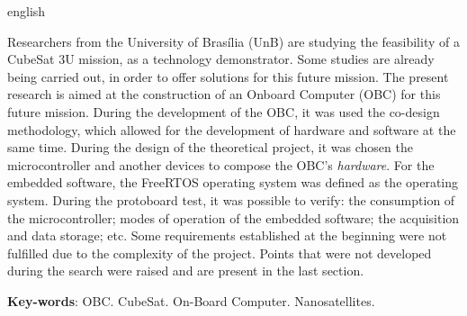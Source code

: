 \begin{resumo}[Abstract]
 \begin{otherlanguage*}{english}
 	
Researchers from the University of Brasília (UnB) are studying the feasibility of a CubeSat 3U mission, as a technology demonstrator. Some studies are already being carried out, in order to offer solutions for this future mission. The present research is aimed at the construction of an Onboard Computer (OBC) for this future mission. During the development of the OBC, it was used the co-design methodology, which allowed for the development of hardware and software at the same time. During the design of the theoretical project, it was chosen the microcontroller and another devices to compose the OBC's \textit {hardware}. For the embedded software, the FreeRTOS operating system was defined as the operating system. During the protoboard test, it was possible to verify: the consumption of the microcontroller; modes of operation of the embedded software; the acquisition and data storage; etc. Some requirements established at the beginning were not fulfilled due to the complexity of the project. Points that were not developed during the search were raised and are present in the last section.
   \vspace{\onelineskip}
 
   \noindent 
   \textbf{Key-words}: OBC. CubeSat. On-Board Computer. Nanosatellites.
 \end{otherlanguage*}
\end{resumo}
